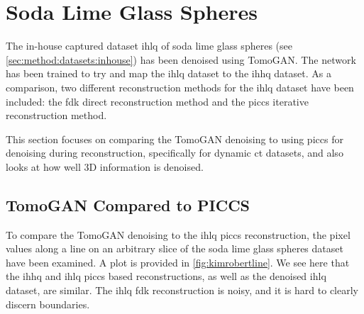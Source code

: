 \section{Soda Lime Glass Spheres}
The in-house captured dataset \gls{ihlq} of soda lime glass spheres (see \cref{sec:method:datasets:inhouse}) has been denoised using TomoGAN. The network has been trained to try and map the \gls{ihlq} dataset to the \gls{ihhq} dataset. As a comparison, two different reconstruction methods for the \gls{ihlq} dataset have been included: the \gls{fdk} direct reconstruction method and the \gls{piccs} iterative reconstruction method. 

This section focuses on comparing the TomoGAN denoising to using \gls{piccs} for denoising during reconstruction, specifically for dynamic \gls{ct} datasets, and also looks at how well 3D information is denoised. 

\subsection{TomoGAN Compared to PICCS}
To compare the TomoGAN denoising to the \gls{ihlq} \gls{piccs} reconstruction, the pixel values along a line on an arbitrary slice of the soda lime glass spheres dataset have been examined. A plot is provided in \cref{fig:kimrobertline}. We see here that the \gls{ihhq} and \gls{ihlq} \gls{piccs} based reconstructions, as well as the denoised \gls{ihlq} dataset, are similar. The \gls{ihlq} \gls{fdk} reconstruction is noisy, and it is hard to clearly discern boundaries. 

